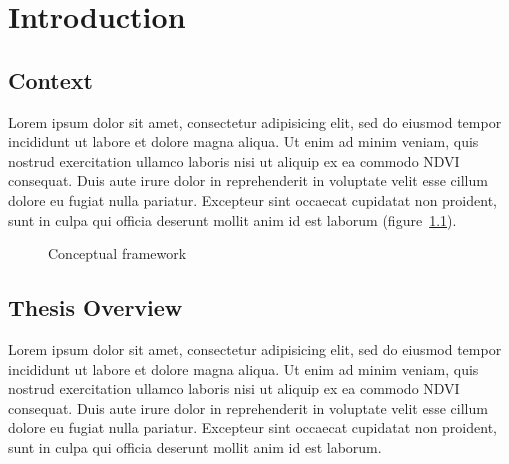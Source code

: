 \chapter{Introduction}
\label{cha:introduction}
\edgeindexfalse
\vspace*{\fill}


\newpage
\edgeindextrue

\section{Context}

    Lorem ipsum dolor sit amet, consectetur adipisicing elit, sed do eiusmod
    tempor incididunt ut labore et dolore magna aliqua. Ut enim ad minim veniam,
    quis nostrud exercitation ullamco laboris nisi ut aliquip ex ea commodo \ac{NDVI}
    consequat. Duis aute irure dolor in reprehenderit in voluptate velit esse
    cillum dolore eu fugiat nulla pariatur. Excepteur sint occaecat cupidatat non
    proident, sunt in culpa qui officia deserunt mollit anim id est laborum (figure~\ref{fig:conceptualFramework}).

    \begin{figure}[h]
        \caption{Conceptual framework}
        \label{fig:conceptualFramework}
    \end{figure}



\section{Thesis Overview}

    Lorem ipsum dolor sit amet, consectetur adipisicing elit, sed do eiusmod
    tempor incididunt ut labore et dolore magna aliqua. Ut enim ad minim veniam,
    quis nostrud exercitation ullamco laboris nisi ut aliquip ex ea commodo \ac{NDVI}
    consequat. Duis aute irure dolor in reprehenderit in voluptate velit esse
    cillum dolore eu fugiat nulla pariatur. Excepteur sint occaecat cupidatat non
    proident, sunt in culpa qui officia deserunt mollit anim id est laborum.